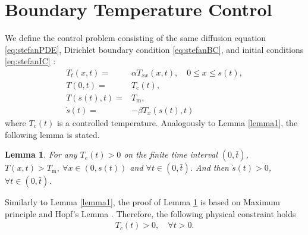 \documentclass[journal]{IEEEtran}
\newtheorem{lem}{Lemma}
\begin{document}
\section{Boundary Temperature Control}\label{sec:tempcontrol}
We define the control problem consisting of the same diffusion equation \eqref{eq:stefanPDE}, Dirichlet boundary condition \eqref{eq:stefanBC}, and initial conditions \eqref{eq:stefanIC} : 
 \begin{align}
 \label{PDEtemp}
 T_{t}(x,t) =& \alpha T_{xx}(x,t), \quad 0\le x\le s(t), \\
\label{BCtemp} T(0,t) =& T_{{\mathrm c}}(t), \\
\label{BC2temp}T(s(t),t) =& T_{{\mathrm m}}, \\
\label{ODEtemp}\dot{s}(t) =& - \beta T_{x}(s(t),t)
\end{align}
where $T_{{\mathrm c}}(t)$ is a controlled  temperature. Analogously to Lemma \ref{lemma1}, the following lemma is stated.
\begin{lem}\label{lemma3}
For any $T_{{\mathrm c}}(t)>0$ on the finite time interval $(0,\bar{t})$, $T(x,t)>T_{{\mathrm m}}, ~\forall x\in(0,s(t))$ and $\forall t\in(0,\bar{t})$. And then $\dot{s}(t) >0$, $\forall t\in(0,\bar{t})$. 
\end{lem}
Similarly to Lemma \ref{lemma1}, the proof of Lemma \ref{lemma3} is based on  Maximum principle and Hopf's Lemma \cite{nonlinearPDE}. Therefore, the  following physical constraint holds
\begin{align}\label{tempconst}
T_{c}(t)>0, \quad \forall t>0.
\end{align}
\end{document}
